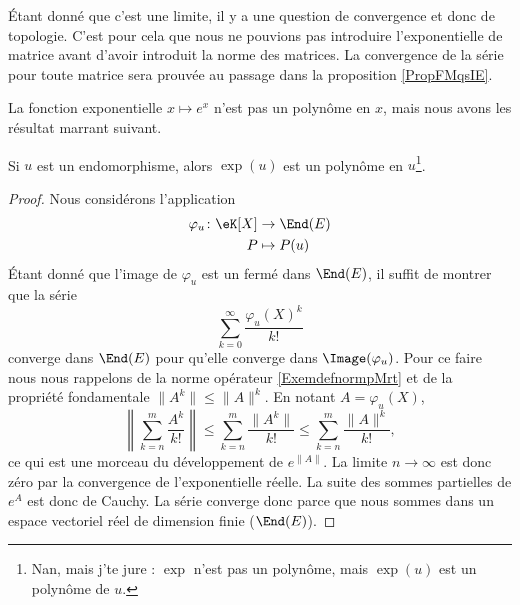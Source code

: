 Étant donné que c'est une limite, il y a une question de convergence et donc de topologie. C'est pour cela que nous ne pouvions pas introduire l'exponentielle de matrice avant d'avoir introduit la norme des matrices. La convergence de la série pour toute matrice sera prouvée au passage dans la proposition \ref{PropFMqsIE}.


La fonction exponentielle \(  x\mapsto e^{x}\) n'est pas un polynôme en \( x\), mais nous avons les résultat marrant suivant.
\begin{proposition} \label{PropFMqsIE}
    Si \( u\) est un endomorphisme, alors \( \exp(u)\) est un polynôme en \( u\)\footnote{Nan, mais j'te jure : \( \exp\) n'est pas un polynôme, mais $\exp(u)$ est un polynôme de \( u\).}.
\end{proposition}

\begin{proof}
    Nous considérons l'application
    \begin{equation}
        \begin{aligned}
            \varphi_u\colon \eK[X]&\to \End(E) \\
            P&\mapsto P(u)
        \end{aligned}
    \end{equation}
    Étant donné que l'image de \( \varphi_u\) est un fermé dans \( \End(E)\), il suffit de montrer que la série
    \begin{equation}
        \sum_{k=0}^{\infty}\frac{ \varphi_u(X)^k }{ k! }
    \end{equation}
    converge dans \( \End(E)\) pour qu'elle converge dans \( \Image(\varphi_u)\). Pour ce faire nous nous rappelons de la norme opérateur \eqref{ExemdefnormpMrt} et de la propriété fondamentale \( \| A^k \|\leq \| A \|^k\). En notant \( A=\varphi_u(X)\),
    \begin{equation}
        \left\| \sum_{k=n}^m\frac{ A^k }{ k! } \right\|\leq \sum_{k=n}^m\frac{ \| A^k \| }{ k! }\leq \sum_{k=n}^m\frac{ \| A \|^k }{ k! },
    \end{equation}
    ce qui est une morceau du développement de \(  e^{\| A \|}\). La limite \( n\to\infty\) est donc zéro par la convergence de l'exponentielle réelle. La suite des sommes partielles de  $e^{A}$ est donc de Cauchy. La série converge donc parce que nous sommes dans un espace vectoriel réel de dimension finie (\( \End(E)\)).
\end{proof}

